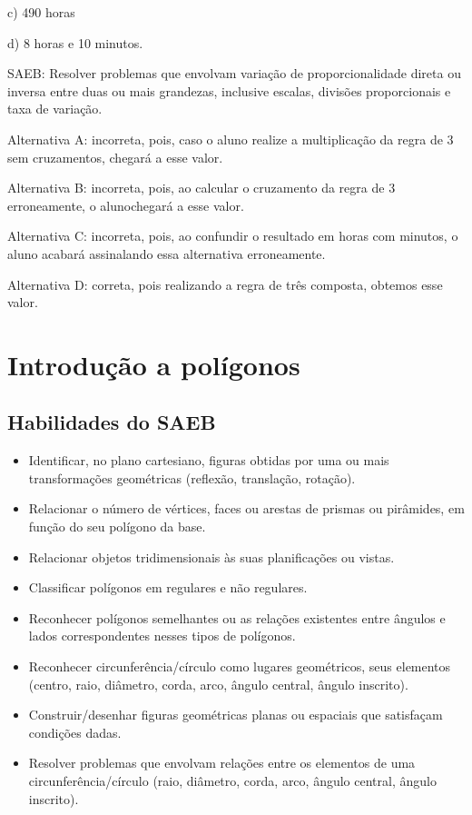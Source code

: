 c) 490 horas

d) 8 horas e 10 minutos.

SAEB: Resolver problemas que envolvam variação de proporcionalidade
direta ou inversa entre duas ou mais grandezas, inclusive escalas,
divisões proporcionais e taxa de variação.

Alternativa A: incorreta, pois, caso o aluno realize a multiplicação da
regra de 3 sem cruzamentos, chegará a esse valor.

Alternativa B: incorreta, pois, ao calcular o cruzamento da regra de 3
erroneamente, o alunochegará a esse valor.

Alternativa C: incorreta, pois, ao confundir o resultado em horas com
minutos, o aluno acabará assinalando essa alternativa erroneamente.

Alternativa D: correta, pois realizando a regra de três composta,
obtemos esse valor.

\chapter{Introdução a polígonos}

\section{Habilidades do SAEB}  

\begin{itemize}
\item
Identificar, no plano cartesiano, figuras obtidas
por uma ou mais transformações geométricas (reflexão, translação,
rotação).
\item
  Relacionar o número de vértices, faces ou arestas de prismas ou
  pirâmides, em função do seu polígono da base.
\item
  Relacionar objetos tridimensionais às suas planificações ou vistas.
\item
  Classificar polígonos em regulares e não regulares.
\item
  Reconhecer polígonos semelhantes ou as relações existentes entre
  ângulos e lados correspondentes nesses tipos de polígonos.
\item
  Reconhecer circunferência/círculo como lugares geométricos, seus
  elementos (centro, raio, diâmetro, corda, arco, ângulo central, ângulo
  inscrito).
\item
  Construir/desenhar figuras geométricas planas ou espaciais que
  satisfaçam condições dadas.
\item
  Resolver problemas que envolvam relações entre os elementos de uma
  circunferência/círculo (raio, diâmetro, corda, arco, ângulo central,
  ângulo inscrito).
\end{itemize}

